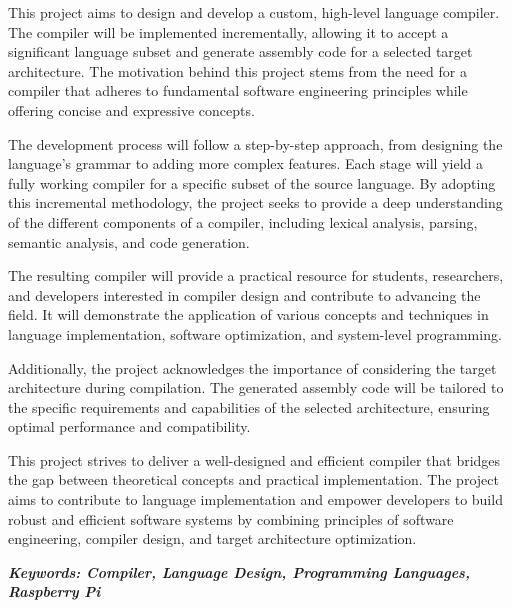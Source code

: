 This project aims to design and develop a custom, high-level language compiler. The compiler will be implemented incrementally, allowing it to accept a significant language subset and generate assembly code for a selected target architecture. The motivation behind this project stems from the need for a compiler that adheres to fundamental software engineering principles while offering concise and expressive concepts.

The development process will follow a step-by-step approach, from designing the language's grammar to adding more complex features. Each stage will yield a fully working compiler for a specific subset of the source language. By adopting this incremental methodology, the project seeks to provide a deep understanding of the different components of a compiler, including lexical analysis, parsing, semantic analysis, and code generation.

The resulting compiler will provide a practical resource for students, researchers, and developers interested in compiler design and contribute to advancing the field. It will demonstrate the application of various concepts and techniques in language implementation, software optimization, and system-level programming.

Additionally, the project acknowledges the importance of considering the target architecture during compilation. The generated assembly code will be tailored to the specific requirements and capabilities of the selected architecture, ensuring optimal performance and compatibility.

This project strives to deliver a well-designed and efficient compiler that bridges the gap between theoretical concepts and practical implementation. The project aims to contribute to language implementation and empower developers to build robust and efficient software systems by combining principles of software engineering, compiler design, and target architecture optimization.

\vspace{2em}
\emph{\textbf{Keywords: Compiler, Language Design, Programming Languages, Raspberry Pi}}